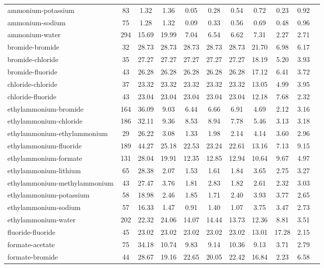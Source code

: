\begin{longtable}{lcccccccccc}
ammonium-potassium & 83  & 1.32 & 1.36 & 0.05 & 0.28 & 0.54 & 0.72 & 0.23 & 0.92\\
ammonium-sodium & 75  & 1.28 & 1.32 & 0.09 & 0.33 & 0.56 & 0.69 & 0.48 & 0.96\\
ammonium-water & 294  & 15.69 & 19.99 & 7.04 & 6.54 & 6.62 & 7.31 & 2.27 & 2.71\\
bromide-bromide & 32  & 28.73 & 28.73 & 28.73 & 28.73 & 28.73 & 21.70 & 6.98 & 6.17\\
bromide-chloride & 35  & 27.27 & 27.27 & 27.27 & 27.27 & 27.27 & 18.19 & 5.20 & 3.93\\
bromide-fluoride & 43  & 26.28 & 26.28 & 26.28 & 26.28 & 26.28 & 17.12 & 6.41 & 3.72\\
chloride-chloride & 37  & 23.32 & 23.32 & 23.32 & 23.32 & 23.32 & 13.05 & 4.99 & 3.95\\
chloride-fluoride & 43  & 23.04 & 23.04 & 23.04 & 23.04 & 23.04 & 12.18 & 7.68 & 2.32\\
ethylammonium-bromide & 164  & 36.09 & 9.03 & 6.44 & 6.66 & 6.91 & 4.69 & 2.12 & 3.16\\
ethylammonium-chloride & 186  & 32.11 & 9.36 & 8.53 & 8.94 & 7.78 & 5.46 & 3.13 & 3.18\\
ethylammonium-ethylammonium & 29  & 26.22 & 3.08 & 1.33 & 1.98 & 2.14 & 4.14 & 3.60 & 2.96\\
ethylammonium-fluoride & 189  & 44.27 & 25.18 & 22.53 & 23.24 & 22.61 & 13.16 & 7.13 & 9.15\\
ethylammonium-formate & 131  & 28.04 & 19.91 & 12.35 & 12.85 & 12.94 & 10.64 & 9.67 & 4.97\\
ethylammonium-lithium & 65  & 28.38 & 2.07 & 1.53 & 1.61 & 1.84 & 3.65 & 2.75 & 3.27\\
ethylammonium-methylammonium & 43  & 27.47 & 3.76 & 1.81 & 2.83 & 1.82 & 2.61 & 2.32 & 3.03\\
ethylammonium-potassium & 58  & 18.98 & 2.46 & 1.85 & 1.71 & 2.40 & 3.93 & 3.77 & 2.65\\
ethylammonium-sodium & 57  & 16.33 & 1.47 & 0.91 & 1.40 & 1.07 & 3.75 & 3.47 & 2.73\\
ethylammonium-water & 202  & 22.32 & 24.06 & 14.07 & 14.44 & 13.73 & 12.36 & 8.81 & 3.51\\
fluoride-fluoride & 45  & 23.02 & 23.02 & 23.02 & 23.02 & 23.02 & 13.01 & 17.28 & 2.15\\
formate-acetate & 75  & 34.18 & 10.74 & 9.83 & 9.14 & 10.36 & 9.13 & 3.71 & 2.79\\
formate-bromide & 44  & 28.67 & 19.16 & 22.65 & 20.05 & 22.42 & 16.84 & 2.23 & 6.58\\

\end{longtable}
